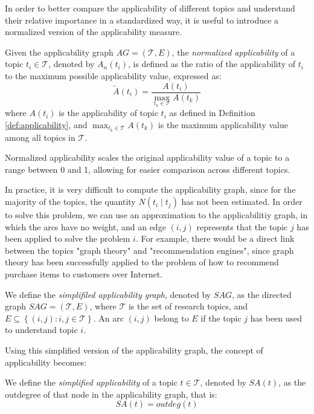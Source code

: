 In order to better compare the applicability of different topics and understand their relative importance in a standardized way, it is useful to introduce a normalized version of the applicability measure.

\begin{definition}
\label{def:normalized-applicability}
Given the applicability graph $AG = (\mathcal{T}, E)$, the \emph{normalized applicability} of a topic $t_i \in \mathcal{T}$, denoted by $A_n(t_i)$, is defined as the ratio of the applicability of $t_i$ to the maximum possible applicability value, expressed as:
\[
\tilde{A}(t_i) = \frac{A(t_i)}{\max_{t_k \in \mathcal{T}} A(t_k)}
\]
where $A(t_i)$ is the applicability of topic $t_i$ as defined in Definition \ref{def:applicability}, and $\max_{t_k \in \mathcal{T}} A(t_k)$ is the maximum applicability value among all topics in $\mathcal{T}$.
\end{definition}

Normalized applicability scales the original applicability value of a topic to a range between 0 and 1, allowing for easier comparison across different topics.

In practice, it is very difficult to compute the applicability graph, since for the majority of the topics, the quantity $N \left( t_i \mid t_j \right)$ has not been estimated. In order to solve this problem, we can use an approximation to the applicabilitiy graph, in which the arcs have no weight, and an edge $(i, j)$ represents that the topic $j$ has been applied to solve the problem $i$. For example, there would be a direct link between the topics "graph theory" and "recommendation engines", since graph theory has been successfully applied to the problem of how to recommend purchase items to customers over Internet.

\begin{definition}
\label{def:simplified-applicability-graph}
We define the \emph{simplifiled applicability graph}, denoted by $SAG$, as the directed graph $SAG = (\mathcal{T}, E)$, where $\mathcal{T}$ is the set of research topics, and $E\subseteq\left\{ (i,j):i,j\in \mathcal{T} \right\} $. An arc $(i, j)$ belong to $E$ if the topic $j$ has been used to understand topic $i$.
\end{definition}

Using this simplified version of the applicability graph, the concept of applicability becomes:

\begin{definition}
\label{def:simplified-applicability}
We define the \emph{simplified applicability} of a topic $t\in \mathcal{T}$, denoted by $SA(t)$, as the outdegree of that node in the applicability graph, that is:
\[
SA(t) = outdeg(t)
\]
\end{definition}

